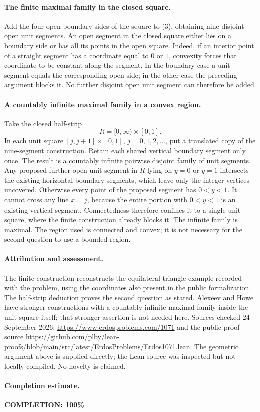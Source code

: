 \paragraph{The finite maximal family in the closed square.}
Add the four open boundary sides of the square to (3), obtaining nine disjoint open unit segments. An open segment in the closed square either lies on a boundary side or has all its points in the open square. Indeed, if an interior point of a straight segment has a coordinate equal to \(0\) or \(1\), convexity forces that coordinate to be constant along the segment. In the boundary case a unit segment equals the corresponding open side; in the other case the preceding argument blocks it. No further disjoint open unit segment can therefore be added.

\paragraph{A countably infinite maximal family in a convex region.}
Take the closed half-strip
\[
 R=[0,\infty)\times[0,1].
\]
In each unit square \([j,j+1]\times[0,1]\), \(j=0,1,2,\ldots\), put a translated copy of the nine-segment construction. Retain each shared vertical boundary segment only once. The result is a countably infinite pairwise disjoint family of unit segments.
Any proposed further open unit segment in \(R\) lying on \(y=0\) or \(y=1\) intersects the existing horizontal boundary segments, which leave only the integer vertices uncovered. Otherwise every point of the proposed segment has \(0<y<1\). It cannot cross any line \(x=j\), because the entire portion with \(0<y<1\) is an existing vertical segment. Connectedness therefore confines it to a single unit square, where the finite construction already blocks it. The infinite family is maximal. The region used is connected and convex; it is not necessary for the second question to use a bounded region.

\paragraph{Attribution and assessment.}
The finite construction reconstructs the equilateral-triangle example recorded with the problem, using the coordinates also present in the public formalization. The half-strip deduction proves the second question as stated. Alexeev and Howe have stronger constructions with a countably infinite maximal family inside the unit square itself; that stronger assertion is not needed here. Sources checked 24 September 2026: \url{https://www.erdosproblems.com/1071} and the public proof source \url{https://github.com/plby/lean-proofs/blob/main/src/latest/ErdosProblems/Erdos1071.lean}. The geometric argument above is supplied directly; the Lean source was inspected but not locally compiled. No novelty is claimed.

\paragraph{Completion estimate.}
\textbf{COMPLETION: 100\%}
